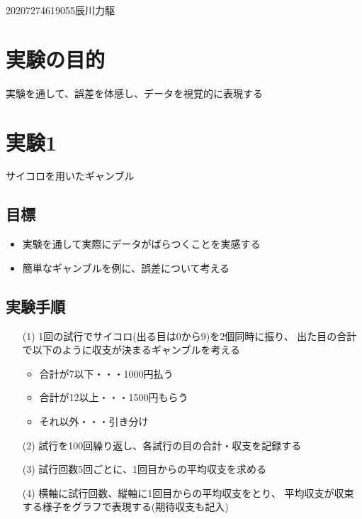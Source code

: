 \documentclass[12pt]{jarticle}
\begin{document}
{2020}{7}{27}{4619055}{辰川力駆}


\section{実験の目的}
実験を通して、誤差を体感し、データを視覚的に表現する

\section{実験1}
サイコロを用いたギャンブル

\subsection{目標}
\begin{itemize}
    \item 実験を通して実際にデータがばらつくことを実感する
    \item 簡単なギャンブルを例に、誤差について考える
\end{itemize}
\subsection{実験手順}
\begin{itemize}
    \item[(1)] 1回の試行でサイコロ(出る目は0から9)を2個同時に振り、
          出た目の合計で以下のように収支が決まるギャンブルを考える
          \begin{itemize}
              \item 合計が7以下・・・1000円払う
              \item 合計が12以上・・・1500円もらう
              \item それ以外・・・引き分け
          \end{itemize}
    \item[(2)] 試行を100回繰り返し、各試行の目の合計・収支を記録する
    \item[(3)] 試行回数5回ごとに、1回目からの平均収支を求める
    \item[(4)] 横軸に試行回数、縦軸に1回目からの平均収支をとり、
          平均収支が収束する様子をグラフで表現する(期待収支も記入)
\end{itemize}
\end{document}
